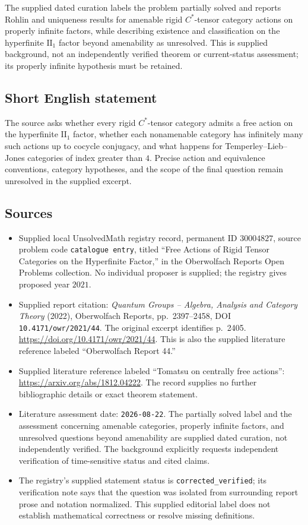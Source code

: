 \documentclass[11pt]{article}
\begin{document}
The supplied dated curation labels the problem partially solved and reports Rohlin and uniqueness results for amenable rigid \(C^*\)-tensor category actions on properly infinite factors, while describing existence and classification on the hyperfinite \(\mathrm{II}_1\) factor beyond amenability as unresolved. This is supplied background, not an independently verified theorem or current-status assessment; its properly infinite hypothesis must be retained.
\subsection{Short English statement}
The source asks whether every rigid \(C^*\)-tensor category admits a free action on the hyperfinite \(\mathrm{II}_1\) factor, whether each nonamenable category has infinitely many such actions up to cocycle conjugacy, and what happens for Temperley--Lieb--Jones categories of index greater than \(4\). Precise action and equivalence conventions, category hypotheses, and the scope of the final question remain unresolved in the supplied excerpt.
\subsection{Sources}
\begin{itemize}
\item Supplied local UnsolvedMath registry record, permanent ID \(30004827\), source problem code \texttt{catalogue entry}, titled ``Free Actions of Rigid Tensor Categories on the Hyperfinite Factor,'' in the Oberwolfach Reports Open Problems collection. No individual proposer is supplied; the registry gives proposed year \(2021\).
\item Supplied report citation: \emph{Quantum Groups -- Algebra, Analysis and Category Theory} (2022), Oberwolfach Reports, pp.~2397--2458, DOI \texttt{10.4171/owr/2021/44}. The original excerpt identifies p.~2405. \url{https://doi.org/10.4171/owr/2021/44}. This is also the supplied literature reference labeled ``Oberwolfach Report 44.''
\item Supplied literature reference labeled ``Tomatsu on centrally free actions'': \url{https://arxiv.org/abs/1812.04222}. The record supplies no further bibliographic details or exact theorem statement.
\item Literature assessment date: \texttt{2026-08-22}. The partially solved label and the assessment concerning amenable categories, properly infinite factors, and unresolved questions beyond amenability are supplied dated curation, not independently verified. The background explicitly requests independent verification of time-sensitive status and cited claims.
\item The registry's supplied statement status is \texttt{corrected\_verified}; its verification note says that the question was isolated from surrounding report prose and notation normalized. This supplied editorial label does not establish mathematical correctness or resolve missing definitions.
\end{itemize}
\end{document}
